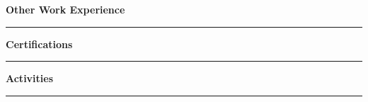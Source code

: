 \documentclass{article}
\begin{document}
\noindent\large{\textbf{Other Work Experience}}\\[-0.6em]
\noindent\rule{\textwidth}{0.4pt}
\begin{normalsize}
    
\end{normalsize}
\vspace{0.7em}


\noindent\large{\textbf{Certifications}}\\[-0.6em]
\noindent\rule{\textwidth}{0.4pt}
\begin{normalsize}
    
\end{normalsize}
\vspace{0.7em}


\noindent\large{\textbf{Activities}}\\[-0.6em]
\noindent\rule{\textwidth}{0.4pt}
\begin{normalsize}
    
\end{normalsize}
\vspace{0.7em}
\end{document}

